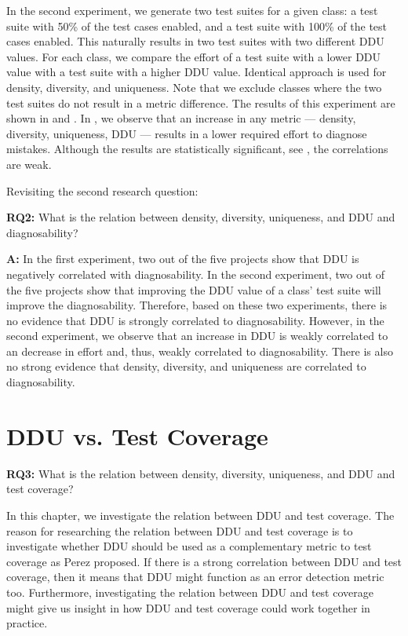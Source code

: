 \documentclass[twoside,a4paper,11pt]{memoir}
\begin{document}
In the second experiment, we generate two test suites for a given class: a test suite with 50\% of the test cases enabled, and a test suite with 100\% of the test cases enabled.
This naturally results in two test suites with two different DDU values.
For each class, we compare the effort of a test suite with a lower DDU value with a test suite with a higher DDU value.
Identical approach is used for density, diversity, and uniqueness.
Note that we exclude classes where the two test suites do not result in a metric difference.
The results of this experiment are shown in  and .
In , we observe that an increase in any metric --- density, diversity, uniqueness, DDU --- results in a lower required effort to diagnose mistakes.
Although the results are statistically significant, see , the correlations are weak.

Revisiting the second research question:
\begin{framed}
\noindent
\textbf{RQ2:} What is the relation between density, diversity, uniqueness, and DDU and diagnosability?
\end{framed}
\textbf{A:} In the first experiment, two out of the five projects show that DDU is negatively correlated with diagnosability.
In the second experiment, two out of the five projects show that improving the DDU value of a class' test suite will improve the diagnosability.
Therefore, based on these two experiments, there is no evidence that DDU is strongly correlated to diagnosability.
However, in the second experiment, we observe that an increase in DDU is weakly correlated to an decrease in effort and, thus, weakly correlated to diagnosability.
There is also no strong evidence that density, diversity, and uniqueness are correlated to diagnosability.

\chapter{DDU vs. Test Coverage}
\label{ch:rq3}

\begin{framed}
\noindent
\textbf{RQ3:} What is the relation between density, diversity, uniqueness, and DDU and test coverage?
\end{framed}

In this chapter, we investigate the relation between DDU and test coverage.
The reason for researching the relation between DDU and test coverage is to investigate whether DDU should be used as a complementary metric to test coverage as Perez \etal proposed.
If there is a strong correlation between DDU and test coverage, then it means that DDU might function as an error detection metric too.
Furthermore, investigating the relation between DDU and test coverage might give us insight in how DDU and test coverage could work together in practice.
\end{document}

